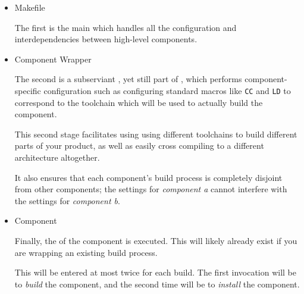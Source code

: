\begin{itemize}
\item \lmsbw Makefile

  The first is the main \lmsbw \makefile which handles all the
  configuration and interdependencies between high-level components.

\item Component Wrapper \makefile

  The second is a subserviant \makefile, yet still part of \lmsbw,
  which performs component-specific configuration such as configuring
  standard \makefile macros like \texttt{CC} and \texttt{LD} to
  correspond to the toolchain which will be used to actually build the
  component.

  This second stage facilitates using using different toolchains to
  build different parts of your product, as well as easily cross
  compiling to a different architecture altogether.

  It also ensures that each component's build process is completely
  disjoint from other components; the settings for \emph{component a}
  cannot interfere with the settings for \emph{component b}.

\item Component \makefile

  Finally, the \makefile of the component is executed.  This will
  likely already exist if you are wrapping an existing build process.

  This \makefile will be entered at most twice for each build.  The
  first invocation will be to \emph{build} the component, and the
  second time will be to \emph{install} the component.
\end{itemize}
